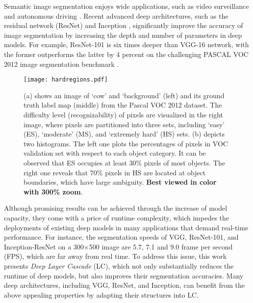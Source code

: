 \documentclass[10pt,twocolumn,letterpaper]{article}
\begin{document}
Semantic image segmentation enjoys wide applications, such as video surveillance \cite{farabet2013learning, TSN2016ECCV} and autonomous driving \cite{geiger2012we, Cordts2016Cityscapes}.
Recent advanced deep architectures, such as the residual network (ResNet) \cite{He2015} and Inception \cite{szegedy2016inception}, significantly improve the accuracy of image segmentation by increasing the depth and number of parameters in deep models.
For example, ResNet-101 is six times deeper than VGG-16 \cite{simonyan2014very} network, with the former outperforms the latter by 4 percent on the challenging PASCAL VOC 2012 image segmentation benchmark \cite{everingham2010pascal}.

\begin{figure}[t]
\begin{center}
\texttt{[image: hardregions.pdf]}
\vskip -0.2cm
\caption{\small{(a) shows an image of `cow' and `background' (left) and its ground truth label map (middle) from the Pascal VOC 2012 dataset. The difficulty level (\eg recognizability) of pixels are visualized in the right image, where pixels are partitioned into three sets, including `easy' (ES), `moderate' (MS), and `extremely hard' (HS) sets. (b) depicts two histograms. The left one plots the percentages of pixels in VOC validation set with respect to each object category. It can be observed that ES occupies at least 30\% pixels of most objects. The right one reveals that 70\% pixels in HS are located at object boundaries, which have large ambiguity. \textbf{Best viewed in color with 300\% zoom}.}}
\label{fig:intro}
\vspace{-20pt}
\end{center}
\end{figure}


Although promising results can be achieved through the increase of model capacity, they come with a price of runtime complexity,
which impedes the deployments of existing deep models in many applications that demand real-time performance.
For instance, the segmentation speeds of VGG, ResNet-101, and Inception-ResNet on a 300$\times$500 image are 5.7, 7.1 and 9.0 frame per second (FPS), which are far away from real time.
To address this issue, this work presents \emph{Deep Layer Cascade} (LC), which not only substantially reduces the runtime of deep models, but also improves their segmentation accuracies.
Many deep architectures, including VGG, ResNet, and Inception, can benefit from the above appealing properties by adapting their structures into LC.
\end{document}
